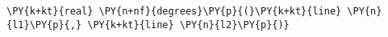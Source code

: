 \begin{Verbatim}[commandchars=\\\{\}]
    \PY{k+kt}{real} \PY{n+nf}{degrees}\PY{p}{(}\PY{k+kt}{line} \PY{n}{l1}\PY{p}{,} \PY{k+kt}{line} \PY{n}{l2}\PY{p}{)}
\end{Verbatim}
